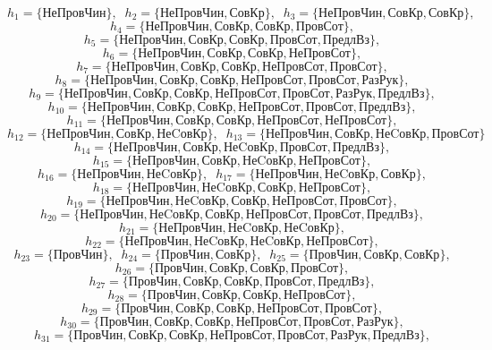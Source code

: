 $$	h_{1} = \{\text{НеПровЧин}\}, \;\; h_{2} = \{\text{НеПровЧин}, \text{СовКр}\}, \;\; h_{3} = \{\text{НеПровЧин}, \text{СовКр}, \text{СовКр}\}, $$
$$	h_{4} = \{\text{НеПровЧин}, \text{СовКр}, \text{СовКр}, \text{ПровСот}\}, $$
$$	h_{5} = \{\text{НеПровЧин}, \text{СовКр}, \text{СовКр}, \text{ПровСот}, \text{ПредлВз}\}, $$
$$	h_{6} = \{\text{НеПровЧин}, \text{СовКр}, \text{СовКр}, \text{НеПровСот}\}, $$
$$	h_{7} = \{\text{НеПровЧин}, \text{СовКр}, \text{СовКр}, \text{НеПровСот}, \text{ПровСот}\}, $$
$$	h_{8} = \{\text{НеПровЧин}, \text{СовКр}, \text{СовКр}, \text{НеПровСот}, \text{ПровСот}, \text{РазРук}\}, $$
$$	h_{9} = \{\text{НеПровЧин}, \text{СовКр}, \text{СовКр}, \text{НеПровСот}, \text{ПровСот}, \text{РазРук}, \text{ПредлВз}\}, $$
$$	h_{10} = \{\text{НеПровЧин}, \text{СовКр}, \text{СовКр}, \text{НеПровСот}, \text{ПровСот}, \text{ПредлВз}\}, $$
$$	h_{11} = \{\text{НеПровЧин}, \text{СовКр}, \text{СовКр}, \text{НеПровСот}, \text{НеПровСот}\}, $$
$$	h_{12} = \{\text{НеПровЧин}, \text{СовКр}, \text{НеCовКр}\},\;\;h_{13} = \{\text{НеПровЧин}, \text{СовКр}, \text{НеCовКр}, \text{ПровСот}\} $$
$$	h_{14} = \{\text{НеПровЧин}, \text{СовКр}, \text{НеCовКр}, \text{ПровСот}, \text{ПредлВз}\}, $$
$$	h_{15} = \{\text{НеПровЧин}, \text{СовКр}, \text{НеCовКр}, \text{НеПровСот}\}, $$
$$	h_{16} = \{\text{НеПровЧин}, \text{НеCовКр}\},\;\;h_{17} = \{\text{НеПровЧин}, \text{НеCовКр}, \text{СовКр}\}, $$
$$	h_{18} = \{\text{НеПровЧин}, \text{НеCовКр}, \text{СовКр}, \text{НеПровСот}\}, $$
$$	h_{19} = \{\text{НеПровЧин}, \text{НеCовКр}, \text{СовКр}, \text{НеПровСот}, \text{ПровСот}\}, $$
$$	h_{20} = \{\text{НеПровЧин}, \text{НеCовКр}, \text{СовКр}, \text{НеПровСот}, \text{ПровСот}, \text{ПредлВз}\}, $$
$$	h_{21} = \{\text{НеПровЧин}, \text{НеCовКр}, \text{НеCовКр}\}, $$
$$	h_{22} = \{\text{НеПровЧин}, \text{НеCовКр}, \text{НеCовКр}, \text{НеПровСот}\}, $$
$$	h_{23} = \{\text{ПровЧин}\}, \;\; h_{24} = \{\text{ПровЧин}, \text{СовКр}\}, \;\; h_{25} = \{\text{ПровЧин}, \text{СовКр}, \text{СовКр}\}, $$
$$	h_{26} = \{\text{ПровЧин}, \text{СовКр}, \text{СовКр}, \text{ПровСот}\}, $$
$$	h_{27} = \{\text{ПровЧин}, \text{СовКр}, \text{СовКр}, \text{ПровСот}, \text{ПредлВз}\}, $$
$$	h_{28} = \{\text{ПровЧин}, \text{СовКр}, \text{СовКр}, \text{НеПровСот}\}, $$
$$	h_{29} = \{\text{ПровЧин}, \text{СовКр}, \text{СовКр}, \text{НеПровСот}, \text{ПровСот}\}, $$
$$	h_{30} = \{\text{ПровЧин}, \text{СовКр}, \text{СовКр}, \text{НеПровСот}, \text{ПровСот}, \text{РазРук}\}, $$
$$	h_{31} = \{\text{ПровЧин}, \text{СовКр}, \text{СовКр}, \text{НеПровСот}, \text{ПровСот}, \text{РазРук}, \text{ПредлВз}\}, $$
